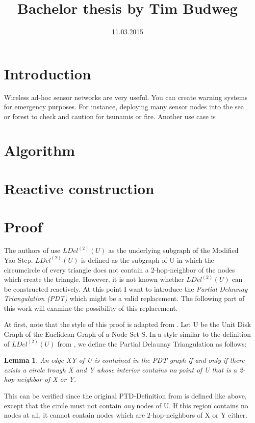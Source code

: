 \documentclass[a4paper,twoside, onecolumn]{IEEEtran}
\title{Bachelor thesis by Tim Budweg}
\author{}
\date{11.03.2015}
\newtheorem{emptycircle}{Lemma}[section]
\begin{document}
\maketitle

\section{Introduction}
Wireless ad-hoc sensor networks are very useful. 
You can create warning systems for emergency purposes.
For instance, deploying many sensor nodes into the sea or forest to check and caution for tsunamis or fire.
Another use case is
\section{Algorithm}
\section{Reactive construction}
\section{Proof}
The authors of \cite{kanj} use $LDel^{(2)}(U) $ as the underlying subgraph of the Modified Yao Step.
$LDel^{(2)}(U) $ is defined as the subgraph of U in which the circumcircle of every triangle does not contain a 2-hop-neighbor of the nodes which create the triangle.
However, it is not known whether $LDel^{(2)}(U) $ can be constructed reactively.
At this point I want to introduce the \emph{Partial Delaunay Triangulation (PDT)} \cite{pdt} which might be a valid replacement.
The following part of this work will examine the possibility of this replacement.

At first, note that the style of this proof is adapted from \cite{kanj}.
Let U be the Unit Disk Graph of the Euclidean Graph of a Node Set S.
In a style similar to the definition of $LDel^{(2)}(U) $ from \cite{kanj}, we define the Partial Delaunay Triangulation as follows:
\begin{emptycircle}
\label{emptycircle}
An edge XY of U is contained in the PDT graph if and only if there exists a circle trough X and Y whose interior contains no point of U that is a 2-hop neighbor of X or Y.
\end{emptycircle}
This can be verified since the original PTD-Definition from \cite{pdt} is defined like above, except that the circle must not contain \emph{any} nodes of U. 
If this region contains no nodes at all, it cannot contain nodes which are 2-hop-neighbors of X or Y either.  
\end{document}
